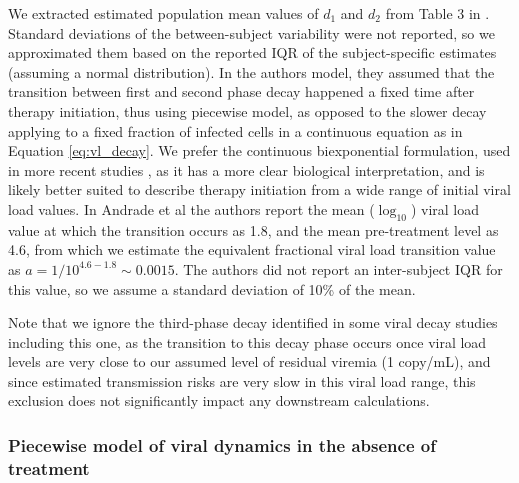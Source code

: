 \documentclass{article}[11pt]
\begin{document}
We extracted estimated population mean values of $d_1$ and $d_2$ from Table 3 in \cite{andrade2013}. Standard deviations of the between-subject variability were not reported, so we approximated them based on the reported IQR of the subject-specific estimates (assuming a normal distribution). In the authors model, they assumed that the transition between first and second phase decay happened a fixed time after therapy initiation, thus using piecewise model, as opposed to the slower decay applying to a fixed fraction of infected cells in a continuous equation as in Equation \eqref{eq:vl_decay}. We prefer the continuous biexponential formulation, used in more recent studies , as it has a more clear biological interpretation, and is likely better suited to describe therapy initiation from a wide range of initial viral load values. In Andrade et al the authors report the mean ($\log_{10}$) viral load value at which the transition occurs as 1.8, and the mean pre-treatment level as 4.6, from which we estimate the equivalent fractional viral load transition value as $a = 1/10^{4.6-1.8} \sim 0.0015$. The authors did not report an inter-subject IQR for this value, so we assume a standard deviation of 10\% of the mean. 


Note that we ignore the third-phase decay identified in some viral decay studies including this one, as the transition to this decay phase occurs once viral load levels are very close to our assumed level of residual viremia (1 copy/mL), and since estimated transmission risks are very slow in this viral load range, this exclusion does not significantly impact any downstream calculations. 


\subsubsection*{Piecewise model of viral dynamics in the absence of treatment}
\end{document}
